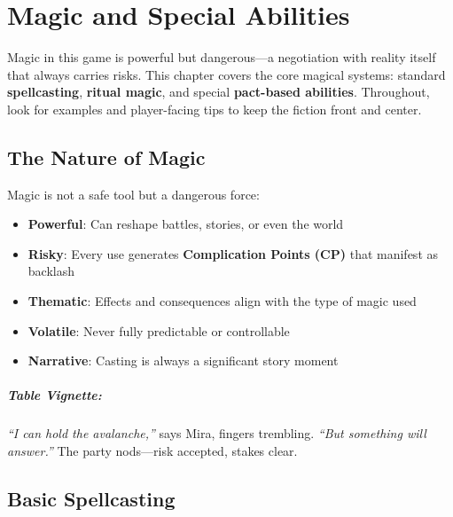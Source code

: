 
\chapter{Magic and Special Abilities} \label{ch:magic}

\begin{multicols}{2}

Magic in this game is powerful but dangerous—a negotiation with reality itself that always carries risks. This chapter covers the core magical systems: standard \textbf{spellcasting}, \textbf{ritual magic}, and special \textbf{pact-based abilities}. Throughout, look for examples and player-facing tips to keep the fiction front and center.

\section{The Nature of Magic} 

Magic is not a safe tool but a dangerous force:
\begin{itemize}
\item \textbf{Powerful}: Can reshape battles, stories, or even the world
\item \textbf{Risky}: Every use generates \textbf{Complication Points (CP)} that manifest as backlash
\item \textbf{Thematic}: Effects and consequences align with the type of magic used
\item \textbf{Volatile}: Never fully predictable or controllable
\item \textbf{Narrative}: Casting is always a significant story moment
\end{itemize}

\paragraph{Table Vignette:}
\emph{“I can hold the avalanche,”} says Mira, fingers trembling. \emph{“But something will answer.”} The party nods—risk accepted, stakes clear.

\section{Basic Spellcasting} 


\end{multicols}
